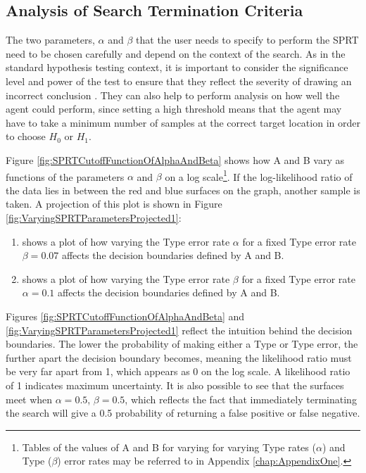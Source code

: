 \subsection{Analysis of Search Termination Criteria}
The two parameters, $\alpha$ and $\beta$ that the user needs to specify to perform the SPRT need to be chosen carefully and depend on the context of the search. As in the standard hypothesis testing context, it is important to consider the significance level and power of the test to ensure that they reflect the severity of drawing an incorrect conclusion \cite{IntroductionToMathematicalStatistics}. They can also help to perform analysis on how well the agent could perform, since setting a high threshold means that the agent may have to take a minimum number of samples at the correct target location in order to choose $H_0$ or $H_1$. \par

Figure \ref{fig:SPRTCutoffFunctionOfAlphaAndBeta} shows how A and B vary as functions of the parameters $\alpha$ and $\beta$ on a log scale\footnote{Tables of the values of A and B for varying for varying Type  rates ($\alpha$) and Type  ($\beta$) error rates may be referred to in Appendix \ref{chap:AppendixOne}.}. If the log-likelihood ratio of the data lies in between the red and blue surfaces on the graph, another sample is taken. A projection of this plot is shown in Figure \ref{fig:VaryingSPRTParametersProjected1}:
\begin{enumerate}[label=(\alph*)]
    \item shows a plot of how varying the Type  error rate $\alpha$ for a fixed Type  error rate $\beta = 0.07$ affects the decision boundaries defined by A and B.
    \item shows a plot of how varying the Type  error rate $\beta$ for a fixed Type  error rate $\alpha = 0.1$ affects the decision boundaries defined by A and B.
\end{enumerate}

Figures \ref{fig:SPRTCutoffFunctionOfAlphaAndBeta} and \ref{fig:VaryingSPRTParametersProjected1} reflect the intuition behind the decision boundaries. The lower the probability of making either a Type  or Type  error, the further apart the decision boundary becomes, meaning the likelihood ratio must be very far apart from 1, which appears as 0 on the log scale. A likelihood ratio of 1 indicates maximum uncertainty. It is also possible to see that the surfaces meet when $\alpha=0.5$, $\beta=0.5$, which reflects the fact that immediately terminating the search will give a 0.5 probability of returning a false positive or false negative. \par

